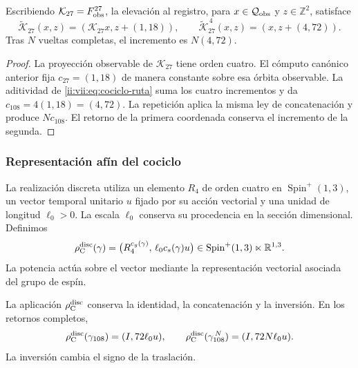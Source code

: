 \begin{proposition}
\label{ii:vii:prop:memoria-vuelta-completa}
Escribiendo \(\mathcal K_{27}=F_{\rm obs}^{27}\), la elevación
al registro, para \(x\in\mathcal Q_{\rm obs}\) y \(z\in\mathbb Z^2\), satisface
\[
 \widetilde{\mathcal K}_{27}(x,z)
   =(\mathcal K_{27}x,z+(1,18)),\qquad
 \widetilde{\mathcal K}_{27}^{\,4}(x,z)
   =(x,z+(4,72)).
\]
Tras \(N\) vueltas completas, el incremento es \(N(4,72)\).
\end{proposition}

\begin{proof}
La proyección observable de \(\mathcal K_{27}\) tiene orden cuatro.
El cómputo canónico anterior fija \(c_{27}=(1,18)\) de manera constante
sobre esa órbita observable. La aditividad de
\eqref{ii:vii:eq:cociclo-ruta} suma los cuatro incrementos y da
\(c_{108}=4(1,18)=(4,72)\).
La repetición aplica la misma ley de concatenación y produce
\(Nc_{108}\). El retorno de la primera coordenada conserva el
incremento de la segunda.
\end{proof}

\subsubsection{Representación afín del cociclo}
\label{ii:vii:subsec:representacion-afin-cociclo}

La realización discreta utiliza un elemento \(R_4\) de orden cuatro en
\(\operatorname{Spin}^+(1,3)\), un vector temporal unitario \(u\)
fijado por su acción vectorial y una unidad de longitud \(\ell_0>0\).
La escala \(\ell_0\) conserva su procedencia en la sección dimensional.
Definimos
\begin{equation}
 \rho_{\rm C}^{\rm disc}(\gamma)=
 \bigl(R_4^{c_g(\gamma)},\,\ell_0c_s(\gamma)u\bigr)
 \in\operatorname{Spin}^+(1,3)\ltimes\mathbb R^{1,3}.
 \label{ii:vii:eq:representacion-discreta-memoria}
\end{equation}
La potencia actúa sobre el vector mediante la representación vectorial
asociada del grupo de espín.

\begin{theorem}
\label{ii:vii:thm:traslacion-memoria}
La aplicación \(\rho_{\rm C}^{\rm disc}\) conserva la identidad,
la concatenación y la inversión. En los retornos completos,
\begin{equation}
 \rho_{\rm C}^{\rm disc}(\gamma_{108})=(I,72\ell_0u),\qquad
 \rho_{\rm C}^{\rm disc}(\gamma_{108}^{\,N})=(I,72N\ell_0u).
 \label{ii:vii:eq:traslacion-retorno-108}
\end{equation}
La inversión cambia el signo de la traslación.
\end{theorem}

